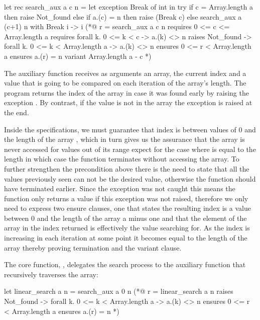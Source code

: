 \begin{gospell}
let rec search_aux a c n =
  let exception Break of int in try
    if c = Array.length a then raise Not_found else if a.(c) = n then raise (Break c) else search_aux a (c+1) n
  with Break i -> i
(*@
  r = search_aux a c n
  requires 0 <= c <= Array.length a
  requires forall k. 0 <= k < c -> a.(k) <> n
  raises Not_found -> forall k. 0 <= k < Array.length a -> a.(k) <> n
  ensures 0 <= r < Array.length a
  ensures a.(r) = n
  variant Array.length a - c
*)
\end{gospell}

The auxiliary function  receives as arguments an array, the current index and a value that is going to be 
compared on each iteration of the array's length. The program returns the index of the array in case it was found early by raising
the exception . By contrast, if the value is not in the array the exception  is raised at the end.

Inside the \gospel specifications, we must guarantee that index  is between values of 0 and the length of the array 
, which in turn gives us the assurance that the array is never accessed for values out of its range expect for the case 
where  is equal to the length in which case the function terminates without accessing the array. To further strengthen the
precondition above there is the need to state that all the values previously seen can not be the desired value, otherwise the function
should have terminated earlier. Since the exception  was not caught this means the function only returns a value
if this exception was not raised, therefore we only need to express two ensure clauses, one that states the resulting index is a value 
between 0 and the length of the array a minus one and that the element of the array in the index returned is effectively the value 
searching for. As the index is increasing in each iteration at some point it becomes equal to the length of the array thereby proving 
termination and the variant clause.

The core function, , delegates the search process to the auxiliary function that recursively traverses 
the array:

\begin{gospell}
let linear_search a n = search_aux a 0 n
(*@
  r = linear_search a n
  raises Not_found -> forall k. 0 <= k < Array.length a -> a.(k) <> n
  ensures 0 <= r < Array.length a
  ensures a.(r) = n
*)
\end{gospell}

